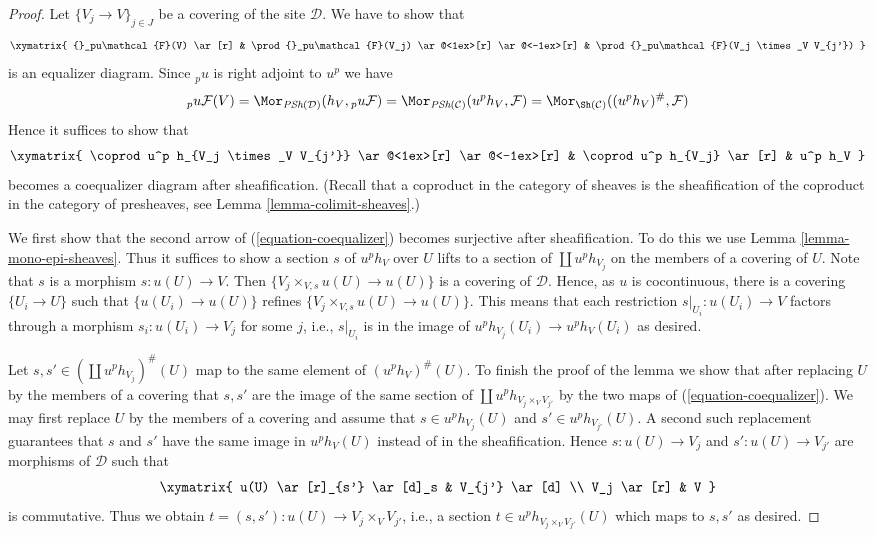 \begin{proof}
Let $\{V_j \to V\}_{j \in J}$ be a covering of the site $\mathcal{D}$.
We have to show that
$$
\xymatrix{
{}_pu\mathcal{F}(V) \ar[r] &
\prod {}_pu\mathcal{F}(V_j) \ar@<1ex>[r] \ar@<-1ex>[r] &
\prod {}_pu\mathcal{F}(V_j \times_V V_{j'})
}
$$
is an equalizer diagram. Since ${}_pu$ is right adjoint to $u^p$
we have
$$
{}_pu\mathcal{F}(V) =
\Mor_{\textit{PSh}(\mathcal{D})}(h_V, {}_pu\mathcal{F}) =
\Mor_{\textit{PSh}(\mathcal{C})}(u^ph_V, \mathcal{F}) =
\Mor_{\Sh(\mathcal{C})}((u^ph_V)^\#, \mathcal{F})
$$
Hence it suffices to show that
\begin{equation}
\label{equation-coequalizer}
\xymatrix{
\coprod u^p h_{V_j \times_V V_{j'}} \ar@<1ex>[r] \ar@<-1ex>[r] &
\coprod u^p h_{V_j} \ar[r] &
u^p h_V
}
\end{equation}
becomes a coequalizer diagram after sheafification. (Recall that a coproduct
in the category of sheaves is the sheafification of the coproduct in the
category of presheaves, see Lemma \ref{lemma-colimit-sheaves}.)

\medskip\noindent
We first show that the second arrow of (\ref{equation-coequalizer})
becomes surjective after sheafification.
To do this we use Lemma \ref{lemma-mono-epi-sheaves}. Thus it suffices to
show a section $s$ of $u^ph_V$ over $U$ lifts
to a section of $\coprod u^p h_{V_j}$ on the members of a covering of $U$.
Note that $s$ is a morphism $s : u(U) \to V$. Then
$\{V_j \times_{V, s} u(U) \to u(U)\}$ is a covering of $\mathcal{D}$.
Hence, as $u$ is cocontinuous, there is a covering $\{U_i \to U\}$
such that $\{u(U_i) \to u(U)\}$ refines $\{V_j \times_{V, s} u(U) \to u(U)\}$.
This means that each restriction $s|_{U_i} : u(U_i) \to V$ factors
through a morphism $s_i : u(U_i) \to V_j$ for some $j$, i.e., $s|_{U_i}$
is in the image of $u^ph_{V_j}(U_i) \to u^ph_V(U_i)$ as desired.

\medskip\noindent
Let $s, s' \in (\coprod u^ph_{V_j})^\#(U)$ map to the same element
of $(u^ph_V)^\#(U)$. To finish the proof of the lemma we show that
after replacing $U$ by the members of a covering that $s, s'$ are
the image of the same section of $\coprod u^p h_{V_j \times_V V_{j'}}$
by the two maps of (\ref{equation-coequalizer}). We may first replace $U$
by the members of a covering and assume that $s \in u^ph_{V_j}(U)$
and $s' \in u^ph_{V_{j'}}(U)$. A second such replacement guarantees
that $s$ and $s'$ have the same image in $u^ph_V(U)$ instead of in
the sheafification. Hence $s : u(U) \to V_j$ and $s' : u(U) \to V_{j'}$
are morphisms of $\mathcal{D}$ such that
$$
\xymatrix{
u(U) \ar[r]_{s'} \ar[d]_s & V_{j'} \ar[d] \\
V_j \ar[r] & V
}
$$
is commutative. Thus we obtain $t = (s, s') : u(U) \to V_j \times_V V_{j'}$,
i.e., a section $t \in u^ph_{V_j \times_V V_{j'}}(U)$
which maps to $s, s'$ as desired.
\end{proof}


